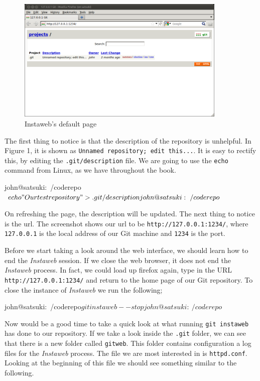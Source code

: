 \begin{figure}[hbt]
\centering
\includegraphics[width=10cm]{images/f-af7-d1.png}
\caption{Instaweb's default page}
\end{figure}

The first thing to notice is that the description of the repository is unhelpful.
In Figure 1, it is shown as \texttt{Unnamed repository; edit this...}.
It is easy to rectify this, by editing the \texttt{.git/description} file.
We are going to use the \texttt{echo} command from Linux, as we have throughout the book.

\begin{code}
john@satsuki:~/coderepo$ echo "Our test repository" > .git/description 
john@satsuki:~/coderepo$ 
\end{code}

On refreshing the page, the description will be updated.
The next thing to notice is the url.
The screenshot shows our url to be \texttt{http://127.0.0.1:1234/}, where \texttt{127.0.0.1} is the local address of our Git machine and \texttt{1234} is the port.

Before we start taking a look around the web interface, we should learn how to end the \emph{Instaweb} session.
If we close the web browser, it does not end the \emph{Instaweb} process.
In fact, we could load up firefox again, type in the URL \texttt{http://127.0.0.1:1234/} and return to the home page of our Git repository.
To close the instance of \emph{Instaweb} we run the following;

\begin{code}
john@satsuki:~/coderepo$ git instaweb --stop
john@satsuki:~/coderepo$ 
\end{code}

Now would be a good time to take a quick look at what running \texttt{git instaweb} has done to our repository.
If we take a look inside the \texttt{.git} folder, we can see that there is a new folder called \texttt{gitweb}.
This folder contains configuration a log files for the \emph{Instaweb} process.
The file we are most interested in is \texttt{httpd.conf}.
Looking at the beginning of this file we should see something similar to the following.


